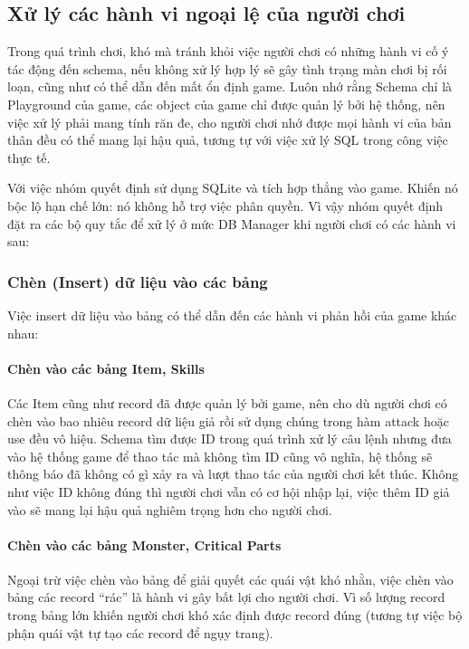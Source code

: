 \subsection{Xử lý các hành vi ngoại lệ của người chơi}

\hspace*{1cm} Trong quá trình chơi, khó mà tránh khỏi việc người chơi có những hành vi cố ý tác động đến schema, nếu không xử lý hợp lý sẽ gây tình trạng màn chơi bị rối loạn, cũng như có thể dẫn đến mất ổn định game. Luôn nhớ rằng Schema chỉ là Playground của game, các object của game chỉ được quản lý bởi hệ thống, nên việc xử lý phải mang tính răn đe, cho người chơi nhớ được mọi hành vi của bản thân đều có thể mang lại hậu quả, tương tự với việc xử lý SQL trong công việc thực tế.

\hspace*{1cm} Với việc nhóm quyết định sử dụng SQLite và tích hợp thẳng vào game. Khiến nó bộc lộ hạn chế lớn: nó không hỗ trợ việc phân quyền. Vì vậy nhóm quyết định đặt ra các bộ quy tắc để xử lý ở mức DB Manager khi người chơi có các hành vi sau:

\subsubsection{Chèn (Insert) dữ liệu vào các bảng}
Việc insert dữ liệu vào bảng có thể dẫn đến các hành vi phản hồi của game khác nhau:

\paragraph{Chèn vào các bảng Item, Skills}
Các Item cũng như record đã được quản lý bởi game, nên cho dù người chơi có chèn vào bao nhiêu record dữ liệu giả rồi sử dụng chúng trong hàm attack hoặc use đều vô hiệu. Schema tìm được ID trong quá trình xử lý câu lệnh nhưng đưa vào hệ thống game để thao tác mà không tìm ID cũng vô nghĩa, hệ thống sẽ thông báo đã không có gì xảy ra và lượt thao tác của người chơi kết thúc. Không như việc ID không đúng thì người chơi vẫn có cơ hội nhập lại, việc thêm ID giả vào sẽ mang lại hậu quả nghiêm trọng hơn cho người chơi.

\paragraph{Chèn vào các bảng Monster, Critical Parts}
Ngoại trừ việc chèn vào bảng để giải quyết các quái vật khó nhằn, việc chèn vào bảng các record ``rác'' là hành vi gây bất lợi cho người chơi. Vì số lượng record trong bảng lớn khiến người chơi khó xác định được record đúng (tương tự việc bộ phận quái vật tự tạo các record để ngụy trang).

